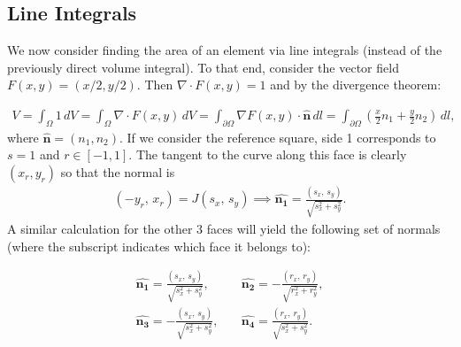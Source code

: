 \documentclass{article}
\begin{document}
\subsection{Line Integrals}
We now consider finding the area of an element via line integrals (instead of the previously direct volume integral). To that end, consider the vector field $F(x,y) = (x/2, y/2)$. Then $\nabla \cdot F(x,y) = 1$ and by the divergence theorem:

  \begin{align*}
    V =  \int_\Omega 1 \, dV = \int_\Omega \nabla \cdot F(x,y) \, dV = \int_{\partial \Omega} \nabla F(x,y) \cdot \hat{\textbf{n}} \, dl = \int_{\partial \Omega} \left( \frac{x}{2}n_1 + \frac{y}{2}n_2 \right)\, dl,
  \end{align*}
where $\hat{\textbf{n}} = (n_1,n_2)$. If we consider the reference square, side 1 corresponds to $s = 1$ and $r \in [-1,1]$. The tangent to the curve along this face is clearly $(x_r,y_r)$ so that the normal is
  \begin{align*}
    (-y_r, \, x_r) = J (s_x, \, s_y) \implies \hat{\boldsymbol{n_1}} = \frac{(s_x, \, s_y)}{\sqrt{s_x^2 + s_y^2}}.
  \end{align*}
A similar calculation for the other 3 faces will yield the following set of normals (where the subscript indicates which face it belongs to):

  \begin{align*}
    \hat{\boldsymbol{n_1}} = \frac{(s_x, \, s_y)}{\sqrt{s_x^2 + s_y^2}}, & \quad
    \hat{\boldsymbol{n_2}} = -\frac{(r_x, \, r_y)}{\sqrt{r_x^2 + r_y^2}}, \\
    \hat{\boldsymbol{n_3}} = -\frac{(s_x, \, s_y)}{\sqrt{s_x^2 + s_y^2}}, & \quad
    \hat{\boldsymbol{n_4}} = \frac{(r_x, \, r_y)}{\sqrt{s_x^2 + s_y^2}}. \\
  \end{align*}


\end{document}
